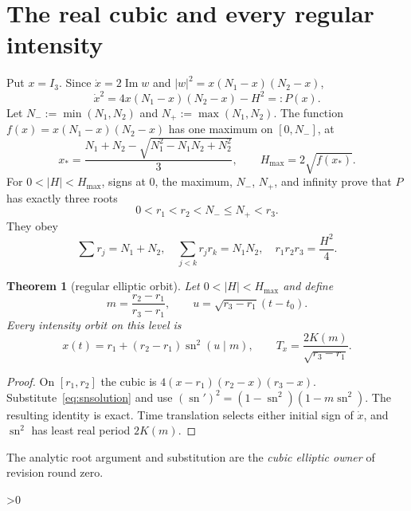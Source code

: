 \documentclass[10pt]{article}
\providecommand{\CRevisionRound}{2}
\newtheorem{theorem}{Theorem}
\newcommand{\sn}{\operatorname{sn}}
\begin{document}
\section{The real cubic and every regular intensity}
Put $x=I_3$.  Since $\dot x=2\operatorname{Im}w$ and
$|w|^2=x(N_1-x)(N_2-x)$,
\begin{equation}\label{eq:cubic}
 \dot x^2=4x(N_1-x)(N_2-x)-H^2=:P(x).
\end{equation}
Let $N_-:=\min(N_1,N_2)$ and $N_+:=\max(N_1,N_2)$.  The function
$f(x)=x(N_1-x)(N_2-x)$ has one maximum on $[0,N_-]$, at
\begin{equation}\label{eq:xstar}
 x_*=\frac{N_1+N_2-\sqrt{N_1^2-N_1N_2+N_2^2}}{3},\qquad
 H_{\max}=2\sqrt{f(x_*)}.
\end{equation}
For $0<|H|<H_{\max}$, signs at $0$, the maximum, $N_-$, $N_+$,
and infinity prove that $P$ has exactly three roots
\begin{equation}\label{eq:rootorder}
 0<r_1<r_2<N_-\le N_+<r_3.
\end{equation}
They obey
\begin{equation}\label{eq:vieta}
 \sum r_j=N_1+N_2,\quad
 \sum_{j<k}r_jr_k=N_1N_2,\quad
 r_1r_2r_3=\frac{H^2}{4}.
\end{equation}

\begin{theorem}[regular elliptic orbit]\label{thm:regular}
Let $0<|H|<H_{\max}$ and define
\[
 m=\frac{r_2-r_1}{r_3-r_1},\qquad
 u=\sqrt{r_3-r_1}(t-t_0).
\]
Every intensity orbit on this level is
\begin{equation}\label{eq:snsolution}
 x(t)=r_1+(r_2-r_1)\sn^2(u\mid m),
 \qquad T_x=\frac{2K(m)}{\sqrt{r_3-r_1}}.
\end{equation}
\end{theorem}

\begin{proof}
On $[r_1,r_2]$ the cubic is
$4(x-r_1)(r_2-x)(r_3-x)$.  Substitute~\eqref{eq:snsolution} and use
$(\sn')^2=(1-\sn^2)(1-m\sn^2)$.  The resulting identity is
exact.  Time translation selects either initial sign of $\dot x$, and
$\sn^2$ has least real period $2K(m)$.
\end{proof}

The analytic root argument and substitution are the \emph{cubic elliptic
owner} of revision round zero.

\ifnum\CRevisionRound>0
\end{document}
